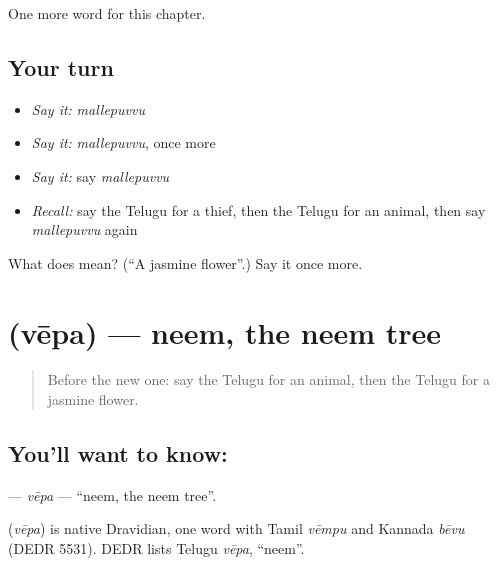 \begin{grammarlens}[title={What you've built}]
One more word for this chapter.
\end{grammarlens}

\subsection*{Your turn}
\begin{itemize}
\raggedright
  \item \emph{Say it:} \emph{mallepuvvu}
  \item \emph{Say it:} \emph{mallepuvvu}, once more
  \item \emph{Say it:} say \emph{mallepuvvu}
  \item \emph{Recall:} say the Telugu for a thief, then the Telugu for an animal, then say \emph{mallepuvvu} again
\end{itemize}

\begin{tcolorbox}[breakable,colback=teal!4,colframe=teal!35!black,title={Before you move on}]
What does  mean? (\textquotedblleft{}A jasmine flower\textquotedblright{}.) Say it once more.
\end{tcolorbox}
\section[\texorpdfstring{\te{వేప} (vēpa)}{వేప (vēpa)}]{ (vēpa) — neem, the neem tree}

\label{lesson:TE-C266-vepa}



\begin{quote}
Before the new one: say the Telugu for an animal, then the Telugu for a jasmine flower.
\end{quote}

\subsection*{You'll want to know: }
\textbf{} — \emph{vēpa} — \textquotedblleft{}neem, the neem tree\textquotedblright{}.

\begin{cousinweb}
\textbf{} (\emph{vēpa}) is native Dravidian, one word with Tamil \emph{vēmpu} and Kannada \emph{bēvu} (DEDR 5531). DEDR lists Telugu \emph{vēpa}, \textquotedblleft{}neem\textquotedblright{}.
\end{cousinweb}

